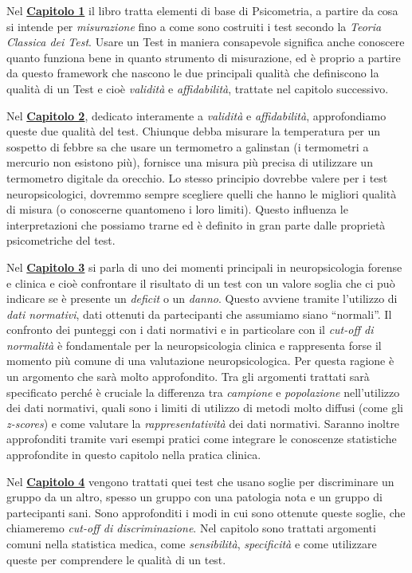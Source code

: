 \documentclass[
  italian,
  letterpaper,
  paper=A4,
  headinclude=on,
  footinclude=on,
  12pt]{scrbook}
\begin{document}
Nel \hyperref[Capitolo-1]{\textbf{Capitolo 1}} il libro tratta elementi
di base di Psicometria, a partire da cosa si intende per
\emph{misurazione} fino a come sono costruiti i test secondo la
\emph{Teoria Classica dei Test}. Usare un Test in maniera consapevole
significa anche conoscere quanto funziona bene in quanto strumento di
misurazione, ed è proprio a partire da questo framework che nascono le
due principali qualità che definiscono la qualità di un Test e cioè
\emph{validità} e \emph{affidabilità}, trattate nel capitolo successivo.

Nel \hyperref[Capitolo-2]{\textbf{Capitolo 2}}, dedicato interamente a
\emph{validità} e \emph{affidabilità}, approfondiamo queste due qualità
del test. Chiunque debba misurare la temperatura per un sospetto di
febbre sa che usare un termometro a galinstan (i termometri a mercurio
non esistono più), fornisce una misura più precisa di utilizzare un
termometro digitale da orecchio. Lo stesso principio dovrebbe valere per
i test neuropsicologici, dovremmo sempre scegliere quelli che hanno le
migliori qualità di misura (o conoscerne quantomeno i loro limiti).
Questo influenza le interpretazioni che possiamo trarne ed è definito in
gran parte dalle proprietà psicometriche del test.

Nel \hyperref[Capitolo-3]{\textbf{Capitolo 3}} si parla di uno dei
momenti principali in neuropsicologia forense e clinica e cioè
confrontare il risultato di un test con un valore soglia che ci può
indicare se è presente un \emph{deficit} o un \emph{danno}. Questo
avviene tramite l'utilizzo di \emph{dati normativi}, dati ottenuti da
partecipanti che assumiamo siano ``normali''. Il confronto dei punteggi
con i dati normativi e in particolare con il \emph{cut-off di normalità}
è fondamentale per la neuropsicologia clinica e rappresenta forse il
momento più comune di una valutazione neuropsicologica. Per questa
ragione è un argomento che sarà molto approfondito. Tra gli argomenti
trattati sarà specificato perché è cruciale la differenza tra
\emph{campione} e \emph{popolazione} nell'utilizzo dei dati normativi,
quali sono i limiti di utilizzo di metodi molto diffusi (come gli
\emph{z-scores}) e come valutare la \emph{rappresentatività} dei dati
normativi. Saranno inoltre approfonditi tramite vari esempi pratici come
integrare le conoscenze statistiche approfondite in questo capitolo
nella pratica clinica.

Nel \hyperref[Capitolo-4]{\textbf{Capitolo 4}} vengono trattati quei
test che usano soglie per discriminare un gruppo da un altro, spesso un
gruppo con una patologia nota e un gruppo di partecipanti sani. Sono
approfonditi i modi in cui sono ottenute queste soglie, che chiameremo
\emph{cut-off di discriminazione}. Nel capitolo sono trattati argomenti
comuni nella statistica medica, come \emph{sensibilità},
\emph{specificità} e come utilizzare queste per comprendere le qualità
di un test.
\end{document}
